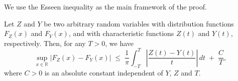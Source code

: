 We use the Esseen inequality \cite{korolev2012improvement, korolev2010upper} as the main framework of the proof.
\begin{lemma}
Let $Z$ and $Y$ be two arbitrary random variables with distribution functions $F_{Z}(x)$ and $F_{Y}(x)$, and with characteristic functions
$Z(t)$ and $Y(t)$, respectively. Then, for any $T>0$, we have
\[
\sup_{x\in\mathbb{R}} |F_{Z}(x)-F_{Y}(x)| 
\;\leq\; \frac{1}{\pi}\int_{-T}^{T} 
\left| \frac{Z(t)-Y(t)}{t} \right| \, dt \;+\; \frac{C}{T},
\]
where $C>0$ is an absolute constant independent of $Y$, $Z$ and $T$.
\end{lemma}

